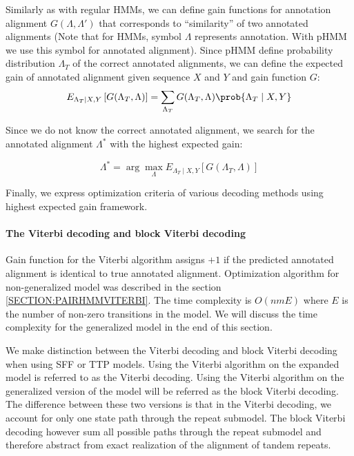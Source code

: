 Similarly as with regular HMMs, we can define gain functions for annotation
alignment $G(\Lambda, \Lambda')$ that corresponds to ``similarity'' of two
annotated alignments (Note that for HMMs, symbol $\Lambda$ represents
annotation. With pHMM we use this symbol for annotated alignment).  Since pHMM
define probability distribution $\Lambda_T$ of the correct annotated
alignments, we can define the expected gain of annotated alignment given
sequence $X$ and $Y$ and gain function $G$: 
\begin{equation}
E_{\Lambda_T\mid X, Y}\left[G(\Lambda_T, \Lambda)\right] = 
\sum_{\Lambda_T}G(\Lambda_T, \Lambda)\prob{\Lambda_T\mid X, Y}
\end{equation}

Since we do not know the correct annotated alignment, we search for the
annotated alignment $\Lambda^*$ with the highest expected gain:

\begin{equation}
\Lambda^* = \arg\max_{\Lambda}
E_{\Lambda_T\mid X, Y}\left[G(\Lambda_T, \Lambda)\right]
\end{equation}

Finally, we express optimization criteria of various decoding methods using
highest expected gain framework.

\paragraph{The Viterbi decoding and block Viterbi decoding} Gain function for
the Viterbi algorithm assigns $+1$ if the predicted annotated alignment is
identical to true annotated alignment. Optimization algorithm for
non-generalized model was described in the section
\ref{SECTION:PAIRHMMVITERBI}. The time complexity is $O(nmE)$ where $E$ is the
number of non-zero transitions in the model. We will discuss the time
complexity for the generalized model in the end of this section.

We make distinction between the Viterbi decoding and block Viterbi
decoding when using SFF or TTP models. Using the Viterbi algorithm on the
expanded model is referred to as the Viterbi decoding. Using the Viterbi
algorithm on the generalized version of the model will be referred as the block
Viterbi decoding. The difference between these two versions is that in the
Viterbi decoding, we account for only one state path through the repeat
submodel.  The block Viterbi decoding however sum all possible paths through
the repeat submodel and therefore abstract from exact realization of the
alignment of tandem repeats.

